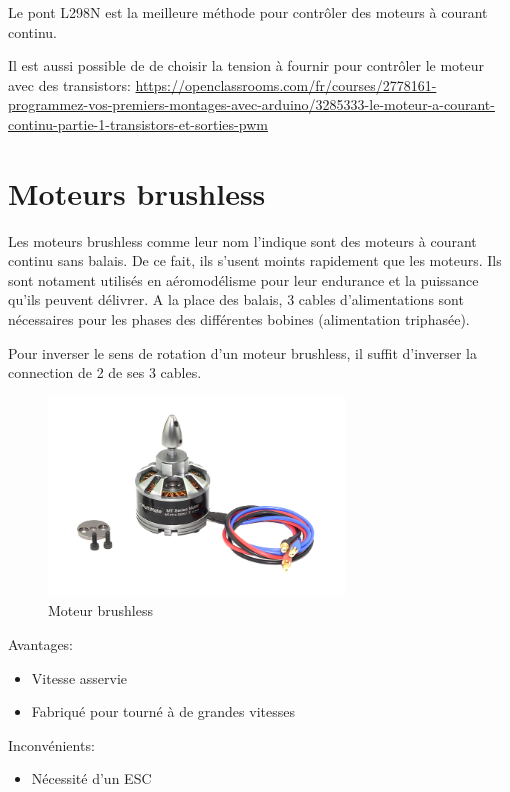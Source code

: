 \documentclass[a4paper, 11pt]{report}
\begin{document}
Le pont L298N est la meilleure méthode pour contrôler des moteurs à courant continu.

Il est aussi possible de de choisir la tension à fournir pour contrôler le moteur avec des transistors:
\url{https://openclassrooms.com/fr/courses/2778161-programmez-vos-premiers-montages-avec-arduino/3285333-le-moteur-a-courant-continu-partie-1-transistors-et-sorties-pwm}

\section{Moteurs brushless}
Les moteurs brushless comme leur nom l'indique sont des moteurs à courant continu sans balais. De ce fait, ils s'usent moints rapidement que les moteurs. Ils sont notament utilisés en aéromodélisme pour leur endurance et la puissance qu'ils peuvent délivrer. A la place des balais, 3 cables d'alimentations sont nécessaires pour les phases des différentes bobines (alimentation triphasée).

Pour inverser le sens de rotation d'un moteur brushless, il suffit d'inverser la connection de 2 de ses 3 cables.

\begin{figure}[h]
\begin{centering}
\includegraphics[width=0.7\textwidth]{images/MoteurBrushless.jpg}
\caption{Moteur brushless}
\par\end{centering}
\end{figure}

Avantages:
\begin{itemize}
\item Vitesse asservie
\item Fabriqué pour tourné à de grandes vitesses
\end{itemize}

Inconvénients:
\begin{itemize}
\item Nécessité d'un ESC
\end{itemize}
\end{document}
